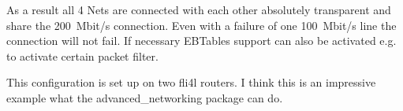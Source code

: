 As a result all 4 Nets are connected with each other absolutely 
transparent and share the 200~Mbit/s connection. Even with a failure
of one 100~Mbit/s line the connection will not fail. If necessary
EBTables support can also be activated e.g. to activate certain packet filter.

This configuration is set up on two fli4l routers. I think this is an 
impressive example what the advanced\_networking package can do.

